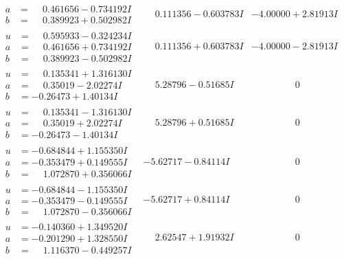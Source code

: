 \documentclass[1p]{elsarticle_modified}
\theoremstyle{definition}
\begin{document}
$$\begin{array}{c|c|c}
\begin{aligned}
a &= \phantom{-}0.461656 - 0.734192 I \\
b &= \phantom{-}0.389923 + 0.502982 I\end{aligned}
 & \phantom{-}0.111356 - 0.603783 I & -4.00000 + 2.81913 I \\ \hline\begin{aligned}
u &= \phantom{-}0.595933 - 0.324234 I \\
a &= \phantom{-}0.461656 + 0.734192 I \\
b &= \phantom{-}0.389923 - 0.502982 I\end{aligned}
 & \phantom{-}0.111356 + 0.603783 I & -4.00000 - 2.81913 I \\ \hline\begin{aligned}
u &= \phantom{-}0.135341 + 1.316130 I \\
a &= \phantom{-}0.35019 - 2.02274 I \\
b &= -0.26473 + 1.40134 I\end{aligned}
 & \phantom{-}5.28796 - 0.51685 I & \phantom{-0.000000 } 0 \\ \hline\begin{aligned}
u &= \phantom{-}0.135341 - 1.316130 I \\
a &= \phantom{-}0.35019 + 2.02274 I \\
b &= -0.26473 - 1.40134 I\end{aligned}
 & \phantom{-}5.28796 + 0.51685 I & \phantom{-0.000000 } 0 \\ \hline\begin{aligned}
u &= -0.684844 + 1.155350 I \\
a &= -0.353479 + 0.149555 I \\
b &= \phantom{-}1.072870 + 0.356066 I\end{aligned}
 & -5.62717 - 0.84114 I & \phantom{-0.000000 } 0 \\ \hline\begin{aligned}
u &= -0.684844 - 1.155350 I \\
a &= -0.353479 - 0.149555 I \\
b &= \phantom{-}1.072870 - 0.356066 I\end{aligned}
 & -5.62717 + 0.84114 I & \phantom{-0.000000 } 0 \\ \hline\begin{aligned}
u &= -0.140360 + 1.349520 I \\
a &= -0.201290 + 1.328550 I \\
b &= \phantom{-}1.116370 - 0.449257 I\end{aligned}
 & \phantom{-}2.62547 + 1.91932 I & \phantom{-0.000000 } 0 \\ \hline\begin{aligned}

\end{aligned}
\end{array}$$
\end{document}

